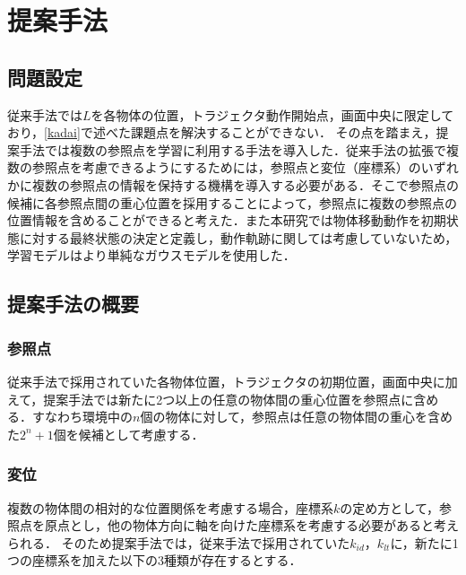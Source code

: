 ﻿%



\chapter{提案手法}

\section{問題設定}

従来手法では$L$を各物体の位置，トラジェクタ動作開始点，画面中央に限定しており，\ref{kadai}で述べた課題点を解決することができない．
その点を踏まえ，提案手法では複数の参照点を学習に利用する手法を導入した．従来手法の拡張で複数の参照点を考慮できるようにするためには，参照点と変位（座標系）のいずれかに複数の参照点の情報を保持する機構を導入する必要がある．そこで参照点の候補に各参照点間の重心位置を採用することによって，参照点に複数の参照点の位置情報を含めることができると考えた．また本研究では物体移動動作を初期状態に対する最終状態の決定と定義し，動作軌跡に関しては考慮していないため，学習モデルはより単純なガウスモデルを使用した．

\section{提案手法の概要}

\subsection{参照点}

従来手法で採用されていた各物体位置，トラジェクタの初期位置，画面中央に加えて，提案手法では新たに2つ以上の任意の物体間の重心位置を参照点に含める．すなわち環境中の$n$個の物体に対して，参照点は任意の物体間の重心を含めた$2^{n}+1$個を候補として考慮する．

\subsection{変位}

複数の物体間の相対的な位置関係を考慮する場合，座標系$k$の定め方として，参照点を原点とし，他の物体方向に軸を向けた座標系を考慮する必要があると考えられる．
そのため提案手法では，従来手法で採用されていた$k_{id}$，$k_{lt}$に，新たに1つの座標系を加えた以下の3種類が存在するとする．

